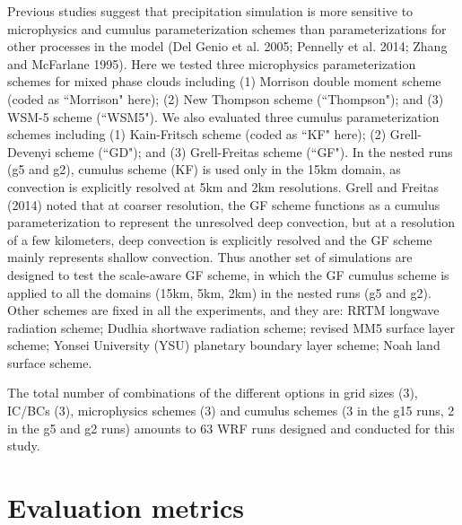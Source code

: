 Previous studies suggest that precipitation simulation is more sensitive to microphysics and cumulus parameterization schemes than parameterizations for other processes in the model (Del Genio et al. 2005; Pennelly et al. 2014; Zhang and McFarlane 1995). Here we tested three microphysics parameterization schemes for mixed phase clouds including (1) Morrison double moment scheme (coded as ``Morrison" here); (2) New Thompson scheme (``Thompson"); and (3) WSM-5 scheme (``WSM5"). We also evaluated three cumulus parameterization schemes including (1) Kain-Fritsch scheme (coded as ``KF" here); (2) Grell-Devenyi scheme (``GD"); and (3) Grell-Freitas scheme (``GF"). In the nested runs (g5 and g2), cumulus scheme (KF) is used only in the 15km domain, as convection is explicitly resolved at 5km and 2km resolutions. Grell and Freitas (2014) noted that at coarser resolution, the GF scheme functions as a cumulus parameterization to represent the unresolved deep convection, but at a resolution of a few kilometers, deep convection is explicitly resolved and the GF scheme mainly represents shallow convection. Thus another set of simulations are designed to test the scale-aware GF scheme, in which the GF cumulus scheme is applied to all the domains (15km, 5km, 2km) in the nested runs (g5 and g2). Other schemes are fixed in all the experiments, and they are: RRTM longwave radiation scheme; Dudhia shortwave radiation scheme; revised MM5 surface layer scheme; Yonsei University (YSU) planetary boundary layer scheme; Noah land surface scheme.

The total number of combinations of the different options in grid sizes (3), IC/BCs (3), microphysics schemes (3) and cumulus schemes (3 in the g15 runs, 2 in the g5 and g2 runs) amounts to 63 WRF runs designed and conducted for this study.


\section{Evaluation metrics}

